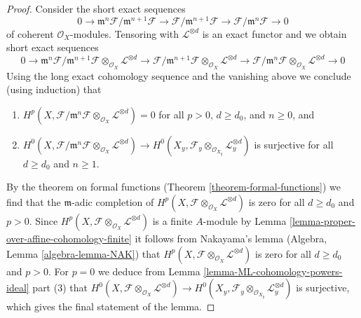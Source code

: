 \begin{proof}
\medskip\noindent
Consider the short exact sequences
$$
0 \to \mathfrak m^n\mathcal{F}/\mathfrak m^{n + 1} \mathcal{F}
\to \mathcal{F}/\mathfrak m^{n + 1} \mathcal{F}
\to \mathcal{F}/\mathfrak m^n \mathcal{F} \to 0
$$
of coherent $\mathcal{O}_X$-modules. Tensoring with $\mathcal{L}^{\otimes d}$
is an exact functor and we obtain short exact sequences
$$
0 \to
\mathfrak m^n\mathcal{F}/\mathfrak m^{n + 1} \mathcal{F}
\otimes_{\mathcal{O}_X} \mathcal{L}^{\otimes d}
\to \mathcal{F}/\mathfrak m^{n + 1} \mathcal{F}
\otimes_{\mathcal{O}_X} \mathcal{L}^{\otimes d}
\to \mathcal{F}/\mathfrak m^n \mathcal{F}
\otimes_{\mathcal{O}_X} \mathcal{L}^{\otimes d} \to 0
$$
Using the long exact cohomology sequence and the vanishing above
we conclude (using induction) that
\begin{enumerate}
\item $H^p(X, \mathcal{F}/\mathfrak m^n \mathcal{F}
\otimes_{\mathcal{O}_X} \mathcal{L}^{\otimes d}) = 0$
for all $p > 0$, $d \geq d_0$, and $n \geq 0$, and
\item $H^0(X, \mathcal{F}/\mathfrak m^n \mathcal{F}
\otimes_{\mathcal{O}_X} \mathcal{L}^{\otimes d}) \to
H^0(X_y, \mathcal{F}_y \otimes_{\mathcal{O}_{X_y}} \mathcal{L}_y^{\otimes d})$
is surjective for all $d \geq d_0$ and $n \geq 1$.
\end{enumerate}
By the theorem on formal functions (Theorem \ref{theorem-formal-functions})
we find that the $\mathfrak m$-adic completion of
$H^p(X, \mathcal{F} \otimes_{\mathcal{O}_X} \mathcal{L}^{\otimes d})$
is zero for all $d \geq d_0$ and $p > 0$.
Since $H^p(X, \mathcal{F} \otimes_{\mathcal{O}_X} \mathcal{L}^{\otimes d})$
is a finite $A$-module by
Lemma \ref{lemma-proper-over-affine-cohomology-finite}
it follows from Nakayama's lemma (Algebra, Lemma \ref{algebra-lemma-NAK})
that $H^p(X, \mathcal{F} \otimes_{\mathcal{O}_X} \mathcal{L}^{\otimes d})$
is zero for all $d \geq d_0$ and $p > 0$.
For $p = 0$ we deduce from
Lemma \ref{lemma-ML-cohomology-powers-ideal} part (3)
that $H^0(X, \mathcal{F} \otimes_{\mathcal{O}_X} \mathcal{L}^{\otimes d}) \to
H^0(X_y, \mathcal{F}_y \otimes_{\mathcal{O}_{X_y}} \mathcal{L}_y^{\otimes d})$
is surjective, which gives the final statement of the lemma.
\end{proof}